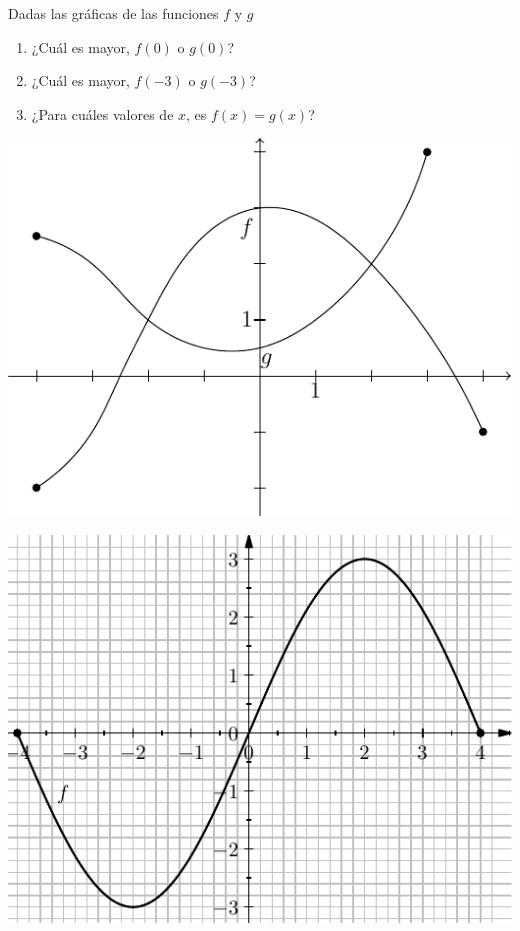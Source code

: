 \documentclass[10pt,twoside]{article}
\begin{document}
\begin{enumerate}
\begin{minipage}{.55\textwidth}
  \item Dadas las gráficas de las funciones $ f $ y $ g $
  \begin{enumerate}
    \item ¿Cuál es mayor, $ f(0) $ o $ g(0) $?
    \item ¿Cuál es mayor, $ f(-3) $ o $ g(-3) $?
    \item ¿Para cuáles valores de $ x $, es $ f(x)=g(x) $?
  \end{enumerate}
\end{minipage}\hfill
\begin{minipage}{.4\textwidth}
\includegraphics[scale=.6]{asys/funciones_f_g.pdf} 
\end{minipage}
  \begin{minipage}{.45\textwidth}
\includegraphics[scale=.7]{asys/funcion_3.pdf} 

\end{minipage}
\end{enumerate}
\end{document}
